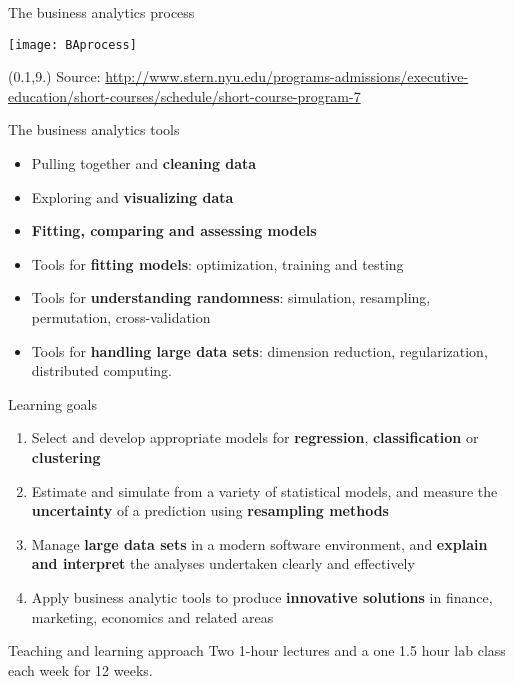\documentclass[14pt]{beamer}
\begin{document}
\begin{frame}{\large The business analytics process}

\centerline{\texttt{[image: BAprocess]}}

\begin{textblock}{12.8}(0.1,9.)\fontsize{5}{7}\sffamily
Source: \url{http://www.stern.nyu.edu/programs-admissions/executive-education/short-courses/schedule/short-course-program-7}
\end{textblock}

\end{frame}


\begin{frame}{\large The business analytics tools}
\begin{itemize}
\item Pulling together and \textbf{cleaning data}
\item  Exploring and \textbf{visualizing data}
\item  \textbf{Fitting, comparing and assessing models}
\item  Tools for \textbf{fitting models}: optimization, training and testing
\item  Tools for \textbf{understanding randomness}: simulation, resampling, permutation, cross-validation
\item Tools for \textbf{handling large data sets}: dimension reduction, regularization, distributed computing.
\end{itemize}
\end{frame}

\begin{frame}{Learning goals}\fontsize{13}{14}\sf

\begin{enumerate}
\item Select and develop appropriate models for \textbf{regression}, \textbf{classification} or \textbf{clustering} 
\item Estimate and simulate from a variety of statistical models, and measure the \textbf{uncertainty} of a prediction using \textbf{resampling methods}
\item Manage \textbf{large data sets} in a modern software environment, and \textbf{explain and interpret} the analyses undertaken clearly and effectively
\item Apply business analytic tools to produce \textbf{innovative solutions} in finance, marketing, economics and related areas
\end{enumerate}


\begin{alertblock}{Teaching and learning approach}
Two 1-hour lectures and a one 1.5 hour lab class each week for 12 weeks.
\end{alertblock}
\end{frame}
\end{document}
